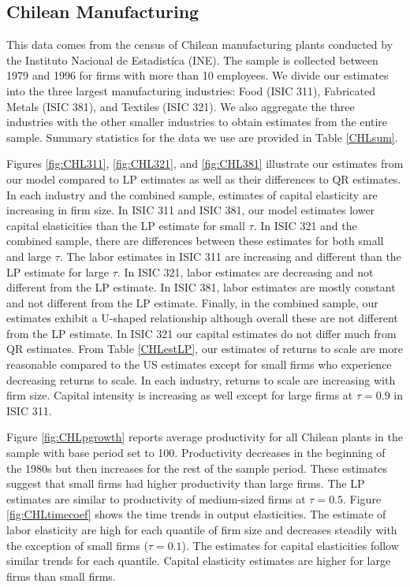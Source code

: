 \documentclass[11pt]{article}
\begin{document}

\subsection{Chilean Manufacturing}
This data comes from the census of Chilean manufacturing plants conducted by the Instituto Nacional de Estadist\'ica (INE). The sample is collected between 1979 and 1996 for firms with more than 10 employees. We divide our estimates into the three largest manufacturing industries: Food (ISIC 311), Fabricated Metals (ISIC 381), and Textiles (ISIC 321). We also aggregate the three industries with the other smaller industries to obtain estimates from the entire sample. Summary statistics for the data we use are provided in Table \ref{CHLsum}.

Figures \ref{fig:CHL311}, \ref{fig:CHL321}, and \ref{fig:CHL381} illustrate our estimates from our model compared to LP estimates as well as their differences to QR estimates. In each industry and the combined sample, estimates of capital elasticity are increasing in firm size. In ISIC 311 and ISIC 381, our model estimates lower capital elasticities than the LP estimate for small $\tau$. In ISIC 321 and the combined sample, there are differences between these estimates for both small and large $\tau$. The labor estimates in ISIC 311 are increasing and different than the LP estimate for large $\tau$. In ISIC 321, labor estimates are decreasing and not different from the LP estimate. In ISIC 381, labor estimates are mostly constant and not different from the LP estimate. Finally, in the combined sample, our estimates exhibit a U-shaped relationship although overall these are not different from the LP estimate. In ISIC 321 our capital estimates do not differ much from QR estimates. From Table \ref{CHLestLP}, our estimates of returns to scale are more reasonable compared to the US estimates except for small firms who experience decreasing returns to scale. In each industry, returns to scale are increasing with firm size. Capital intensity is increasing as well except for large firms at $\tau=0.9$ in ISIC 311.

Figure \ref{fig:CHLpgrowth} reports average productivity for all Chilean plants in the sample with base period set to 100. Productivity decreases in the beginning of the 1980s but then increases for the rest of the sample period. These estimates suggest that small firms had higher productivity than large firms. The LP estimates are similar to productivity of medium-sized firms at $\tau=0.5$. Figure \ref{fig:CHLtimecoef} shows the time trends in output elasticities. The estimate of labor elasticity are high for each quantile of firm size and decreases steadily with the exception of small firms ($\tau=0.1$). The estimates for capital elasticities follow similar trends for each quantile. Capital elasticity estimates are higher for large firms than small firms.
\end{document}
